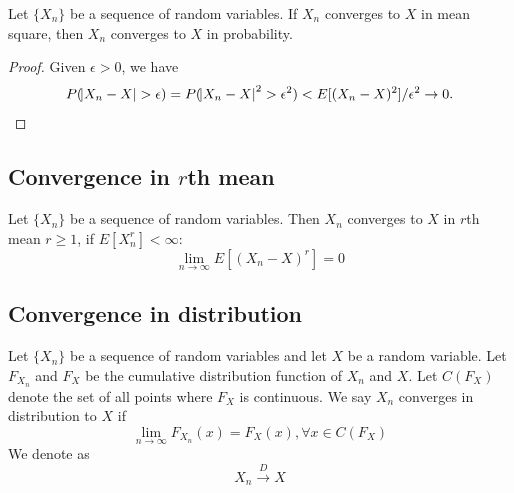 \begin{refsection}
\begin{theorem}\label{ch:theory-of-probability:th:convergenceMSimpliesconvergeninProb}
Let $\{X_n\}$ be a sequence of random variables. If $X_n$ converges to $X$ in mean square, then $X_n$ converges to $X$ in probability.
\end{theorem}
\begin{proof}
Given $\epsilon > 0$, we have
$$P(\abs{X_n-X} > \epsilon)=P(\abs{X_n-X}^2 > \epsilon^2) < E[(X_n-X)^2]/\epsilon^2 \to 0.$$
\end{proof}

\subsection{Convergence in $r$th mean}
\begin{definition}\cite[308]{grimmett2001probability}
Let $\{X_n\}$ be a sequence of random variables. Then $X_n$ converges to $X$ in $r$th mean $r\geq 1$, if $E[X_n^r] < \infty$:
$$\lim_{n\rightarrow \infty }E[(X_n - X)^r] = 0$$
\end{definition}




\subsection{Convergence in distribution }
\begin{definition}
\cite[300]{hoggintroduction}Let $\{X_n\}$ be a sequence of random variables and let $X$ be a random variable. Let $F_{X_n}$ and $F_X$ be the cumulative distribution function of $X_n$ and $X$. Let $C(F_X)$ denote the set of all points where $F_X$ is continuous. We say $X_n$ converges in distribution to $X$ if
$$\lim_{n\rightarrow \infty} F_{X_n}(x) = F_X(x), \forall x\in C(F_X)$$We denote as 
$$X_n \xrightarrow[ ]{D} X $$
\end{definition}



\end{refsection}
